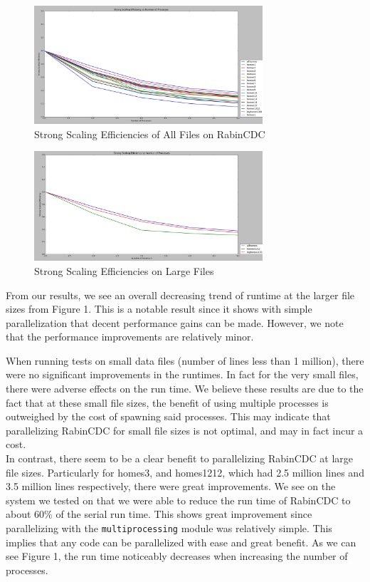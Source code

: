 \documentclass{acmtog} %
\begin{document}
	
	\begin{figure}
				\centerline{\includegraphics[width=8.5cm]{img/StrongScalingAllFiles}}
				\caption{Strong Scaling Efficiencies of All Files on RabinCDC}
				\label{fig:strongscale}
	\end{figure}
		\begin{figure}
			\centerline{\includegraphics[width=8.5cm]{img/StrongScalingLargeFile}}
			\caption{Strong Scaling Efficiencies on Large Files}
			\label{fig:strongscalelarge}
		\end{figure}
	From our results, we see an overall decreasing trend of runtime at the larger file sizes from Figure 1. This is a notable result since it shows with simple parallelization that decent performance gains can be made. However, we note that the performance improvements are relatively minor.
	
	When running tests on small data files (number of lines less than 1 million), there were no significant improvements in the runtimes. In fact for the very small files, there were adverse effects on the run time. We believe these results are due to the fact that at these small file sizes, the benefit of using multiple processes is outweighed by the cost of spawning said processes. This may indicate that parallelizing RabinCDC for small file sizes is not optimal, and may in fact incur a cost.\\
	
	In contrast, there seem to be a clear benefit to parallelizing RabinCDC at large file sizes. Particularly for homes3, and homes1212, which had 2.5 million lines and 3.5 million lines respectively, there were great improvements. We see on the system we tested on that we were able to reduce the run time of RabinCDC to about 60\% of the serial run time. This shows great improvement since parallelizing with the \texttt{multiprocessing} module was relatively simple. This implies that any code can be parallelized with ease and great benefit. As we can see Figure 1, the run time noticeably decreases when increasing the number of processes. 
	
\end{document}

